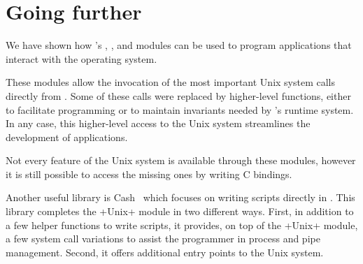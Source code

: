 %
%

\chapter*{Going further}
\label{sec/more}

We have shown how \ocaml's , , and
 modules can be used to program applications that
interact with the operating system.

These modules allow the invocation of the most important Unix system calls
directly from {\ocaml}. Some of these calls were replaced by higher-level
functions, either to facilitate programming or to maintain invariants
needed by {\ocaml}'s runtime system. In any case, this higher-level
access to the Unix system streamlines the development of applications.

Not every feature of the Unix system is available through these
modules, however it is still possible to access the missing ones by
writing C bindings.

Another useful library is Cash~\cite{Cash} which focuses on writing
scripts directly in {\ocaml}. This library completes the \ml+Unix+
module in two different ways. First, in addition to a few helper
functions to write scripts, it provides, on top of the \ml+Unix+
module, a few system call variations to assist the programmer in
process and pipe management. Second, it offers additional entry points
to the Unix system.
